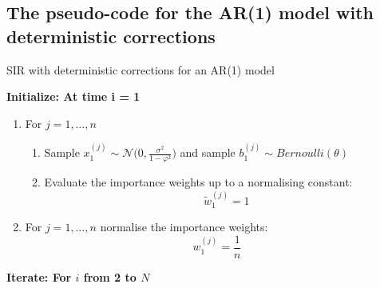 \subsection{The pseudo-code for the AR(1) model with deterministic corrections}

\begin{algorithm}[H]
\caption{SIR with deterministic corrections for an AR(1) model}\label{euclid}
 \begin{algorithmic}

 \State  \bf{Initialize:} \normalfont At time i = 1
            
\begin{enumerate}
	\item For $j = 1, \dots , n$
	\begin{enumerate}
		\item Sample $x_{1}^{(j)} \sim \mathcal{N} \Bigg (0, \frac{\sigma^2}{1- \varphi^2} \Bigg)$ and sample $b_1^{(j)} \sim Bernoulli(\theta)$
		\item Evaluate the importance weights up to a normalising constant:
		\[
		\tilde{w}^{(j)}_{1} = 1
		\]
	\end{enumerate}
	\item For $j = 1, \dots , n$ normalise the importance weights: 
	\[
	w^{(j)}_{1} = \frac{1}{n}
	\]
\end{enumerate}

 \State  \bf{Iterate:} \normalfont For $i$ from 2 to $N$


\end{algorithmic}
\end{algorithm}
